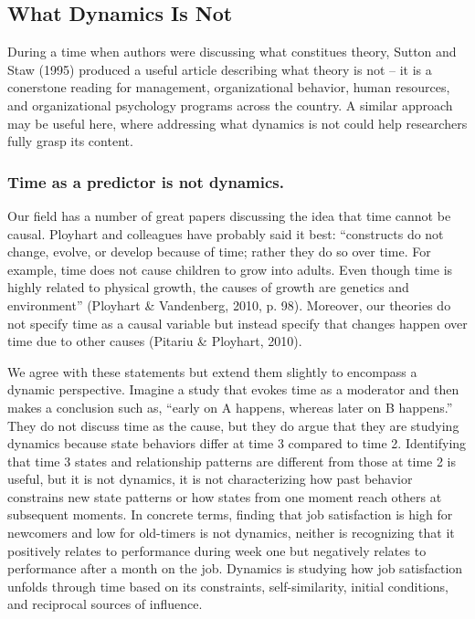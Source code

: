 \documentclass[english,,man]{apa6}
\theoremstyle{definition}
\theoremstyle{definition}
\theoremstyle{definition}
\theoremstyle{remark}
\begin{document}
\hypertarget{what-dynamics-is-not}{%
\subsection{What Dynamics Is Not}\label{what-dynamics-is-not}}

During a time when authors were discussing what constitues theory,
Sutton and Staw (1995) produced a useful article describing what theory
is not -- it is a conerstone reading for management, organizational
behavior, human resources, and organizational psychology programs across
the country. A similar approach may be useful here, where addressing
what dynamics is not could help researchers fully grasp its content.

\hypertarget{time-as-a-predictor-is-not-dynamics.}{%
\subsubsection{Time as a predictor is not
dynamics.}\label{time-as-a-predictor-is-not-dynamics.}}

Our field has a number of great papers discussing the idea that time
cannot be causal. Ployhart and colleagues have probably said it best:
\enquote{constructs do not change, evolve, or develop because of time;
rather they do so over time. For example, time does not cause children
to grow into adults. Even though time is highly related to physical
growth, the causes of growth are genetics and environment} (Ployhart \&
Vandenberg, 2010, p. 98). Moreover, our theories do not specify time as
a causal variable but instead specify that changes happen over time due
to other causes (Pitariu \& Ployhart, 2010).

We agree with these statements but extend them slightly to encompass a
dynamic perspective. Imagine a study that evokes time as a moderator and
then makes a conclusion such as, \enquote{early on A happens, whereas
later on B happens.} They do not discuss time as the cause, but they do
argue that they are studying dynamics because state behaviors differ at
time 3 compared to time 2. Identifying that time 3 states and
relationship patterns are different from those at time 2 is useful, but
it is not dynamics, it is not characterizing how past behavior
constrains new state patterns or how states from one moment reach others
at subsequent moments. In concrete terms, finding that job satisfaction
is high for newcomers and low for old-timers is not dynamics, neither is
recognizing that it positively relates to performance during week one
but negatively relates to performance after a month on the job. Dynamics
is studying how job satisfaction unfolds through time based on its
constraints, self-similarity, initial conditions, and reciprocal sources
of influence.
\end{document}
